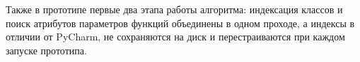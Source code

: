 Также в прототипе первые два этапа работы алгоритма: индексация классов и поиск
атрибутов параметров функций объединены в одном проходе, а индексы в отличии от
PyCharm, не сохраняются на диск и перестраиваются при каждом запуске прототипа.





